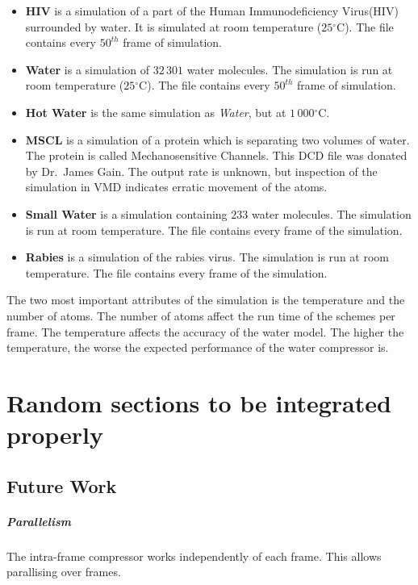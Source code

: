 \documentclass{report}
\newcommand{\degree}{\ensuremath{^\circ}}
\begin{document}
\begin{itemize}
\item{\textbf{HIV}} is a simulation of a part of the Human Immunodeficiency
  Virus(HIV) surrounded by water. It is simulated at room temperature
  ($25\degree$C). The file contains every $50^{th}$ frame of simulation.
\item{\textbf{Water}} is a simulation of $32\,301$ water molecules. The
  simulation is run at room temperature ($25\degree$C). The file contains
  every $50^{th}$ frame of simulation.
\item{\textbf{Hot Water}} is the same simulation as \emph{Water}, but at
  $1\,000\degree$C.
\item{\textbf{MSCL}} is a simulation of a protein which is separating two
  volumes of water. The protein is called Mechanosensitive Channels. This DCD
  file was donated by Dr.~James Gain. The output rate is unknown, but
  inspection of the simulation in VMD indicates erratic movement of the atoms.
\item{\textbf{Small Water}} is a simulation containing $233$ water
  molecules. The simulation is run at room temperature. The file contains
  every frame of the simulation.
\item{\textbf{Rabies}} is a simulation of the rabies virus. The simulation is
  run at room temperature. The file contains every frame of the simulation.
\end{itemize}

The two most important attributes of the simulation is the temperature and the
number of atoms. The number of atoms affect the run time of the schemes per
frame. The temperature affects the accuracy of the water model. The higher the
temperature, the worse the expected performance of the water compressor is.


\chapter{Random sections to be integrated properly}

\section{Future Work}

\paragraph{Parallelism}

The intra-frame compressor works independently of each frame. This allows
parallising over frames.
\end{document}
